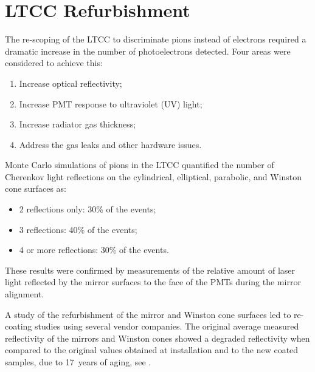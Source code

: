 \section{LTCC Refurbishment}

The re-scoping of the LTCC to discriminate pions instead of electrons required a dramatic increase in the
number of photoelectrons detected. Four areas were considered to achieve this:

\begin{enumerate}
	\item Increase optical reflectivity;
	\item Increase PMT response to ultraviolet (UV) light;
	\item Increase radiator gas thickness;
	\item Address the gas leaks and other hardware issues.
\end{enumerate}

Monte Carlo simulations of pions in the LTCC quantified the number of Cherenkov light  reflections on the cylindrical,
elliptical, parabolic, and Winston cone surfaces as:

\begin{itemize}
	\item 2 reflections only: 30\% of the events;
	\item 3 reflections: 40\% of the events;
	\item 4 or more reflections: 30\% of the events.
\end{itemize}

\noindent
These results were confirmed by measurements of the relative amount of laser light reflected by the
mirror surfaces to the face of the PMTs during the mirror alignment.

A study of the refurbishment of the mirror and Winston cone surfaces led to re-coating studies using
several vendor companies. The original average measured reflectivity of the mirrors and Winston cones
showed a degraded reflectivity when compared to the original values obtained at installation and to the
new coated samples, due to 17~years of aging, see .

